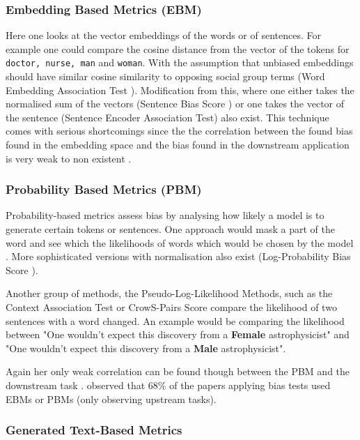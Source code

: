 \subsubsection{Embedding Based Metrics (EBM)}
Here one looks at the vector embeddings of the words or of sentences. For example one could compare the cosine distance from the vector of the tokens for \texttt{doctor, nurse, man} and \texttt{woman}. With the assumption that unbiased embeddings should have similar cosine similarity to opposing social group terms  (Word Embedding Association Test \cite{caliskan2017semantics}). Modification from this, where one either takes the normalised sum of the vectors (Sentence Bias Score \cite{dolci2023improving}) or one takes the vector of the sentence (Sentence Encoder Association Test\cite{may2019measuring}) also exist. This technique comes with serious shortcomings since the the correlation between the found bias found in the embedding space and the bias found in the downstream application is very weak to non existent \cite{goldfarb2021intrinsic,cao2021holistic}. 

\subsubsection{Probability Based Metrics (PBM)}
Probability-based metrics assess bias by analysing how likely a model is to generate certain tokens or sentences. One approach would mask a part of the word and see which the likelihoods of words which would be chosen by the model \cite{webster2020measuring}. More sophisticated versions with normalisation also exist (Log-Probability Bias Score \cite{kurita2019measuring}).

Another group of methods, the Pseudo-Log-Likelihood Methods, such as the Context Association Test or CrowS-Pairs Score compare the likelihood of two sentences with a word changed. An example would be comparing the likelihood between "One wouldn't expect this discovery from a \textbf{Female} astrophysicist" and "One wouldn't expect this discovery from a \textbf{Male} astrophysicist". 

Again her only weak correlation can be found though between the PBM and the downstream task \cite{kaneko2022debiasing, delobelle2022measuring}. \citet{goldfarb2023prompt} observed that 68\% of the papers applying bias tests used EBMs or PBMs (only observing upstream tasks).

\subsubsection{Generated Text-Based Metrics}
\label{subsubsec:generated-text-based-metrics}

